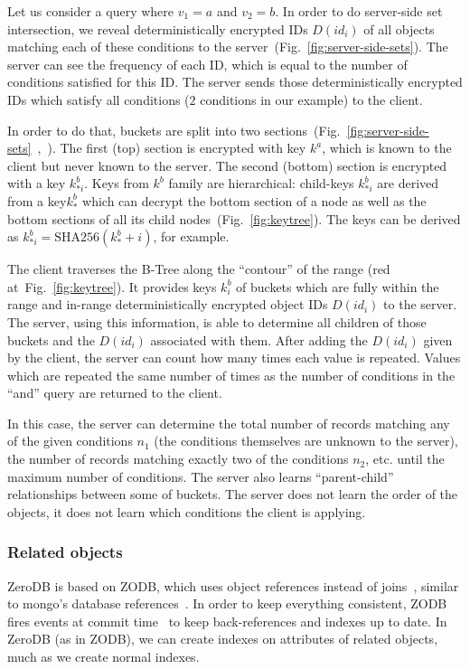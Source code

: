 \documentclass[notitlepage]{revtex4-1}
\newcommand{\figref}[1]{Fig.~\ref{#1}}
\begin{document}
Let us consider a query where $v_1=a$ and $v_2=b$.
In order to do server-side set intersection, we reveal deterministically encrypted IDs $D(id_i)$ of all objects matching each of these conditions to the server~(\figref{fig:server-side-sets}).
The server can see the frequency of each ID, which is equal to the number of conditions satisfied for this ID.
The server sends those deterministically encrypted IDs which satisfy all conditions ($2$ conditions in our example) to the client.

In order to do that, buckets are split into two sections~(\figref{fig:server-side-sets}~,~).
The first (top) section is encrypted with key $k^a$, which is known to the client but never known to the server.
The second (bottom) section is encrypted with a key $k^b_{*i}$.
Keys from $k^b$ family are hierarchical: child-keys $k^b_{*i}$ are derived from a key$k^b_*$  which can decrypt the bottom section of a node as well as the bottom sections of all its child nodes~(\figref{fig:keytree}).
The keys can be derived as $k^b_{*i} = \mbox{SHA256}(k^b_* + i)$, for example.

The client traverses the B-Tree along the ``contour'' of the range (red at~\figref{fig:keytree}).
It provides keys $k^b_i$ of buckets which are fully within the range and in-range deterministically encrypted object IDs $D(id_i)$ to the server.
The server, using this information, is able to determine all children of those buckets and the $D(id_i)$ associated with them.
After adding the $D(id_i)$ given by the client, the server can count how many times each value is repeated.
Values which are repeated the same number of times as the number of conditions in the ``and'' query are returned to the client.

In this case, the server can determine the total number of records matching any of the given conditions $n_1$ (the conditions themselves are unknown to the server),
the number of records matching exactly two of the conditions $n_2$,
etc. until the maximum number of conditions.
The server also learns ``parent-child'' relationships between some of buckets.
The server does not learn the order of the objects,
it does not learn which conditions the client is applying.

\subsubsection{Related objects}

ZeroDB is based on ZODB, which uses object references instead of joins~\cite{zodb-references},
similar to mongo's database references~\cite{mongo-db-references}.
In order to keep everything consistent, ZODB fires events at commit time~\cite{zope-events} to keep back-references and indexes up to date.
In ZeroDB (as in ZODB), we can create indexes on attributes of related objects, much as we create normal indexes.
\end{document}
